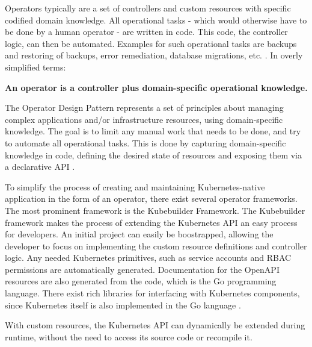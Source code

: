 Operators typically are a set of controllers and custom resources
with specific codified domain knowledge.
All operational tasks -
which would otherwise have to be done by a human operator -
are written in code.
This code, the controller logic, can then be automated.
Examples for such operational tasks are
backups and restoring of backups, error remediation, database migrations, etc.
\autocite{operatorWhitepaperV1}.
In overly simplified terms:

\begin{center}
	\textbf{An operator is a controller plus domain-specific operational knowledge.}
\end{center}


The Operator Design Pattern represents a set of principles about
managing complex applications and/or infrastructure resources,
using domain-specific knowledge.
The goal is to limit any manual work that needs to be done,
and try to automate all operational tasks.
This is done by capturing domain-specific knowledge in code,
defining the desired state of resources and exposing them
via a declarative API
\autocite{operatorWhitepaperV1}.

To simplify the process of creating and maintaining Kubernetes-native application
in the form of an operator,
there exist several operator frameworks.
The most prominent framework is the Kubebuilder Framework.
The Kubebuilder framework makes the process of extending the Kubernetes API
an easy process for developers.
An initial project can easily be boostrapped, allowing the developer to focus
on implementing the custom resource definitions and controller logic.
Any needed Kubernetes primitives, such as service accounts and RBAC permissions
are automatically generated.
Documentation for the OpenAPI resources are also generated from the code,
which is the Go programming language.
There exist rich libraries for interfacing with Kubernetes components,
since Kubernetes itself is also implemented in the Go language
\autocite{kubebuilderBookWebsite}.

With custom resources, the Kubernetes API can dynamically be extended during runtime,
without the need to access its source code or recompile it.

